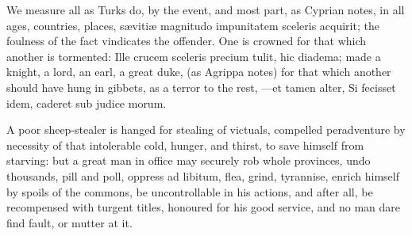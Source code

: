 {We measure all as Turks do, by the event, and most part, as Cyprian
notes, in all ages, countries, places, s\ae{}viti\ae{} magnitudo impunitatem
sceleris acquirit; the foulness of the fact vindicates the offender.
One is crowned for that which another is tormented: Ille crucem
sceleris precium tulit, hic diadema; made a knight, a lord, an earl, a
great duke, (as Agrippa notes) for that which another should have
hung in gibbets, as a terror to the rest,
---et tamen alter,
Si fecisset idem, caderet sub judice morum.

A poor sheep-stealer is hanged for stealing of victuals, compelled
peradventure by necessity of that intolerable cold, hunger, and thirst,
to save himself from starving: but a great man in office may
securely rob whole provinces, undo thousands, pill and poll, oppress ad
libitum, flea, grind, tyrannise, enrich himself by spoils of the
commons, be uncontrollable in his actions, and after all, be
recompensed with turgent titles, honoured for his good service, and no
man dare find fault, or  mutter at it.

}
